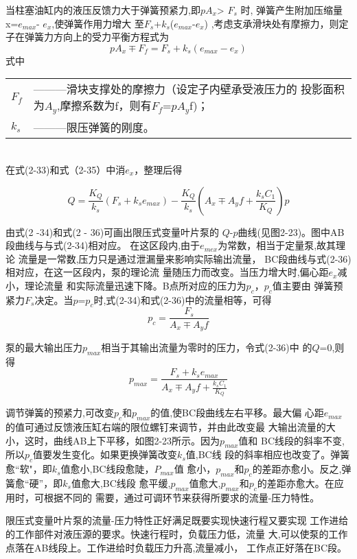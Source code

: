 当柱塞油缸内的液压反馈力大于弹簧预紧力,即$p$$A_x$> $F_s$ 时,
弹簧产生附加压缩量x=$e_{max }$- $e_x$,使弹簧作用力增大
至$F_s$+$k_s$($e_{max}$-$e_x$)
,考虑支承滑块处有摩擦力，则定子在弹簧力方向上的受力平衡方程式为
\begin{equation*}
   pA_x\mp F_f=F_s+k_s(e_{max}-e_x)
\end{equation*}
式中
\begin{tabular}[t]{ll}
    $F_f$&———滑块支撑处的摩擦力（设定子内壁承受液压力的
    投影面积为$A_y$,摩擦系数为f，则有$F_f$=$p$$A_y$f)；\\
    $k_s$&———限压弹簧的刚度。
\end{tabular}\\
在式(2-33)和式（2-35）中消$e_x$，整理后得

\begin{equation*}
   Q=\frac{K_Q}{k_s}(F_s+k_se_{max})-\frac{K_Q}{k_s}(A_x\mp A_yf+\frac{k_sC_1}{K_Q})p
\end{equation*}

由式(2 -34)和式(2 - 36)可画出限压式变量叶片泵的
$Q$-$p$曲线(见图2-23)。图中AB段曲线与与式(2-34)相对应。
在这区段内,由于$e_{mex}$为常数，相当于定量泵,故其理论
流量是一常数,压力只是通过泄漏量来影响实际输出流量，
BC段曲线与式(2-36)相对应，在这一区段内，泵的理论流
量随压力而改变。当压力增大时,偏心距$e_x$减小，理论流量
和实际流量迅速下降。B点所对应的压力为$p_c$，$p_c$值主要由
弹簧预紧力$F_s$决定。当$p$=$p_c$时,式(2-34)和式(2-36)中的流量相等，可得
\begin{equation*}
    p_c=\frac{F_s}{A_x\mp A_yf}
\end{equation*}

泵的最大输出压力$p_{max}$相当于其输出流量为零时的压力，令式(2-36)中
的$Q$=0,则得
\begin{equation*}
p_{max}=\frac{F_s+k_se_{max}}{A_x\mp A_yf+\frac{k_sC_1}{K_Q}}
\end{equation*}

调节弹簧的预紧力,可改变$p_c$和$p_{max}$的值,使BC段曲线左右平移。最大偏
心距$e_{max}$的值可通过反馈液压缸右端的限位螺钉来调节，并由此改变最
大输出流量的大小，这时，曲线AB上下平移，如图2-23所示。因为$p_{max}$值和
BC线段的斜率不变,所以$p_c$值要发生变化。如果更换弹簧改变$k_s$值,BC线
段的斜率相应也改变了。弹簧愈“软"，即$k_s$值愈小,BC线段愈陡，$P_{max}$值
愈小，$p_{max}$和$p_c$的差距亦愈小。反之,弹簧愈“硬”，即$k_s$值愈大,BC线段
愈平缓,$p_{max}$值愈大,$p_{max}$和$p_c$的差距亦愈大。在应用时，可根据不同的
需要，通过可调环节来获得所要求的流量-压力特性。

限压式变量叶片泵的流量-压力特性正好满足既要实现快速行程又要实现
工作进给的工作部件对液压源的要求。快速行程时，负载压力低，流量
大,可以使泵的工作点落在AB线段上。工作进给时负载压力升高,流量减小，
工作点正好落在BC段。

